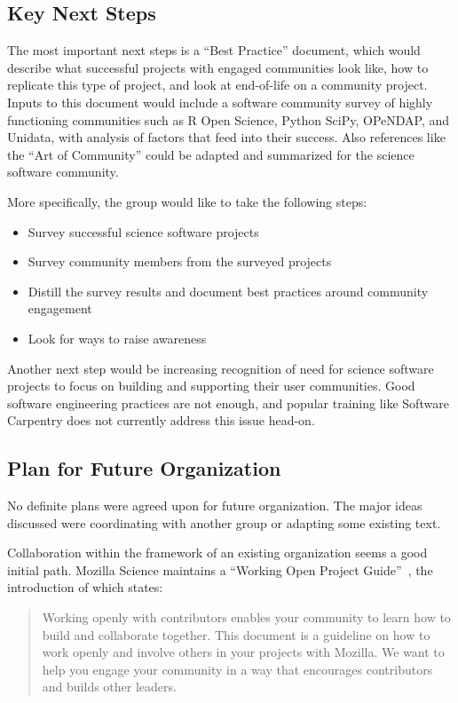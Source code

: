\subsection{Key Next Steps}

The most important next steps is a ``Best Practice'' document, which would
describe what successful projects with engaged communities look like, how to
replicate this type of project, and look at end-of-life on a community project.
Inputs to this document would include a software community survey of highly
functioning communities such as R Open Science, Python SciPy, OPeNDAP, and
Unidata, with analysis of factors that feed into their success. Also references
like the ``Art of Community'' could be adapted and summarized for the science
software community.

More specifically, the group would like to take the following steps:

\begin{itemize}
\item Survey successful science software projects
\item Survey community members from the surveyed projects
\item Distill the survey results and document best practices around community engagement
\item Look for ways to raise awareness
\end{itemize}

Another next step would be increasing recognition of need for science software
projects to focus on building and supporting their user communities. Good software
engineering practices are not enough, and popular training like Software
Carpentry does not currently address this issue head-on.

\subsection{Plan for Future Organization}

No definite plans were agreed upon for future organization. The major ideas discussed
were coordinating with another group or adapting some existing text.

Collaboration within the framework of an existing organization seems a good initial
path. Mozilla Science maintains a ``Working Open Project
Guide''~\cite{working-open-wssspe3}, the introduction of which states:
\begin{quote}
Working openly with contributors enables your community to learn how to build
and collaborate together. This document is a guideline on how to work openly and
involve others in your projects with Mozilla. We want to help you engage your
community in a way that encourages contributors and builds other leaders.
 \end{quote}

